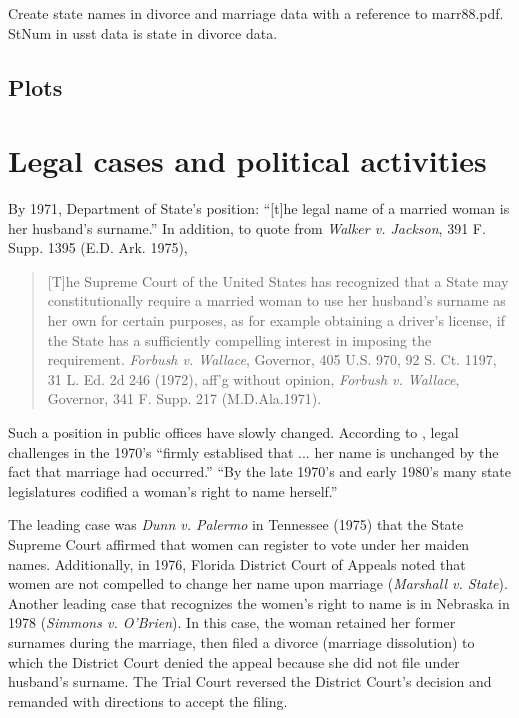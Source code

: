 Create state names in divorce and marriage data with a reference to marr88.pdf. \textsf{StNum} in usst data is \textsf{state} in divorce data.


\subsection{Plots}







\section{Legal cases and political activities}


By 1971, Department of State's position: ``[t]he legal name of a married woman is her husband's surname.'' In addition, to quote from \textit{Walker v. Jackson}, 391 F. Supp. 1395 (E.D. Ark. 1975), 
\begin{quotation}
[T]he Supreme Court of the United States has recognized that a State may constitutionally require a married woman to use her husband's surname as her own for certain purposes, as for example obtaining a driver's license, if the State has a sufficiently compelling interest in imposing the requirement. \textit{Forbush v. Wallace}, Governor, 405 U.S. 970, 92 S. Ct. 1197, 31 L. Ed. 2d 246 (1972), aff'g without opinion, \textit{Forbush v. Wallace}, Governor, 341 F. Supp. 217 (M.D.Ala.1971).
\end{quotation}
Such a position in public offices have slowly changed. According to \citet[][p.6]{Augustine1997}, legal challenges in the 1970's ``firmly establised that ... her name is unchanged by the fact that marriage had occurred.'' ``By the late 1970's and early 1980's many state legislatures codified a woman's right to name herself.'' 

The leading case was \textit{Dunn v. Palermo} in Tennessee (1975) that the State Supreme Court affirmed that women can register to vote under her maiden names. Additionally, in 1976, Florida District Court of Appeals noted that women are not compelled to change her name upon marriage (\textit{Marshall v. State}). Another leading case that recognizes the women's right to name is in Nebraska in 1978 (\textit{Simmons v. O'Brien}). In this case, the woman retained her former surnames during the marriage, then filed a divorce (marriage dissolution) to which the District Court denied the appeal because she did not file under husband's surname. The Trial Court reversed the District Court's decision and remanded with directions to accept the filing.

